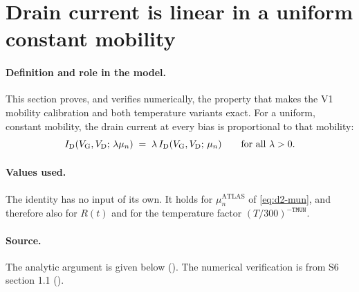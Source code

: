 \section{Drain current is linear in a uniform constant mobility}\label{sec:der-mu-linear}

\paragraph{Definition and role in the model.}
This section proves, and verifies numerically, the property that makes the V1 mobility calibration and both temperature variants exact. For a uniform, constant mobility, the drain current at every bias is proportional to that mobility:
\begin{equation}
  I_{\mathrm{D}}(V_{\mathrm{G}},V_{\mathrm{D}};\,\lambda\mu_n) \;=\; \lambda\,I_{\mathrm{D}}(V_{\mathrm{G}},V_{\mathrm{D}};\,\mu_n)\qquad\text{for all }\lambda>0.
  \label{eq:id-linear-mu}
\end{equation}

\paragraph{Values used.}
The identity has no input of its own. It holds for $\mu_n^{\mathrm{ATLAS}}$ of \cref{eq:d2-mun}, and therefore also for $R(t)$ and for the temperature factor $(T/300)^{-\texttt{TMUN}}$.

\paragraph{Source.}
The analytic argument is given below (\evTHEORY). The numerical verification is from S6 section 1.1 (\evNUM).

